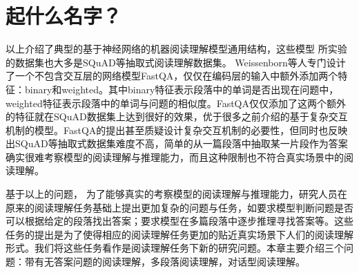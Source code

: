 \section{起什么名字？}
以上介绍了典型的基于神经网络的机器阅读理解模型通用结构，这些模型
所实验的数据集也大多是SQuAD等抽取式阅读理解数据集。
Weissenborn等人专门设计了一个不包含交互层的网络模型FastQA，仅仅在编码层的输入中额外添加两个特征：binary和weighted。其中binary特征表示段落中的单词是否出现在问题中，weighted特征表示段落中的单词与问题的相似度。FastQA仅仅添加了这两个额外的特征就在SQuAD数据集上达到很好的效果，优于很多之前介绍的基于复杂交互机制的模型。FastQA的提出甚至质疑设计复杂交互机制的必要性，但同时也反映出SQuAD等抽取式数据集难度不高，简单的从一篇段落中抽取某一片段作为答案确实很难考察模型的阅读理解与推理能力，而且这种限制也不符合真实场景中的阅读理解。

基于以上的问题，
为了能够真实的考察模型的阅读理解与推理能力，研究人员在原来的阅读理解任务基础上提出更加复杂的问题与任务，如要求模型判断问题是否可以根据给定的段落找出答案；要求模型在多篇段落中逐步推理寻找答案等。这些任务的提出是为了使得相应的阅读理解任务更加的贴近真实场景下人们的阅读理解形式。我们将这些任务看作是阅读理解任务下新的研究问题。本章主要介绍三个问题：带有无答案问题的阅读理解，多段落阅读理解，对话型阅读理解。



